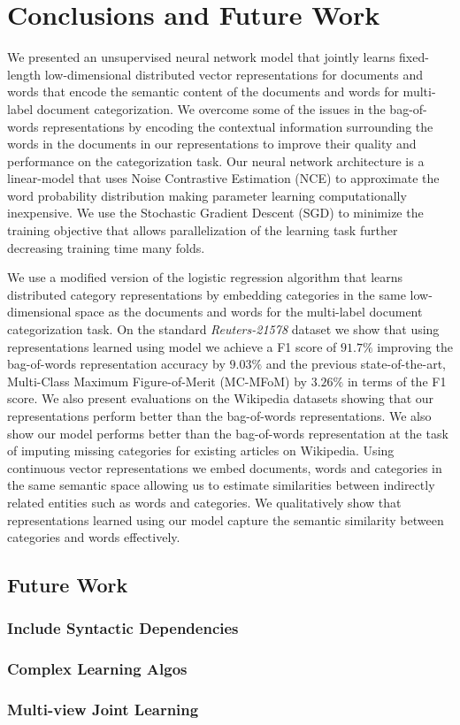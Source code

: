 \chapter{Conclusions and Future Work}
\label{chapter:conclusion}
We presented an unsupervised neural network model that jointly learns fixed-length low-dimensional distributed vector representations for documents and words that encode the semantic content of the documents and words for multi-label document categorization. 
We overcome some of the issues in the bag-of-words representations by encoding the contextual information surrounding the words in the documents in our representations to improve their quality and performance on the categorization task.
Our neural network architecture is a linear-model that uses Noise Contrastive Estimation (NCE) to approximate the word probability distribution making parameter learning computationally inexpensive. We use the Stochastic Gradient Descent (SGD) to minimize the training objective that allows parallelization of the learning task further decreasing training time many folds.

We use a modified version of the logistic regression algorithm that learns distributed category representations by embedding categories in the same low-dimensional space as the documents and words for the multi-label document categorization task. 
On the standard \emph{Reuters-21578} dataset we show that using representations learned using model we achieve a F1 score of $91.7\%$ improving the bag-of-words representation accuracy by $9.03\%$ and the previous state-of-the-art, Multi-Class Maximum Figure-of-Merit (MC-MFoM) by $3.26\%$ in terms of the F1 score. 
We also present evaluations on the Wikipedia datasets showing that our representations perform better than the bag-of-words representations. We also show our model performs better than the bag-of-words representation at the task of imputing missing categories for existing articles on Wikipedia.
Using continuous vector representations we embed documents, words and categories in the same semantic space allowing us to estimate similarities between indirectly related entities such as words and categories. We qualitatively show that representations learned using our model capture the semantic similarity between categories and words effectively.

\section{Future Work}

\subsection{Include Syntactic Dependencies}

\subsection{Complex Learning Algos}

\subsection{Multi-view Joint Learning}